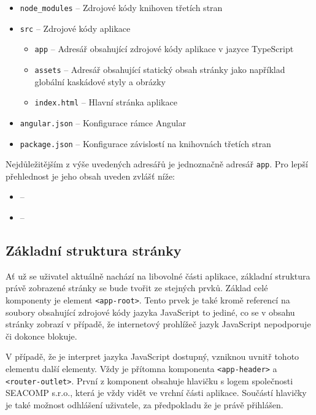 \begin{itemize}
  \item \texttt{node\_modules} -- Zdrojové kódy knihoven třetích stran
  \item \texttt{src} -- Zdrojové kódy aplikace
  \begin{itemize}
    \item \texttt{app} -- Adresář obsahující zdrojové kódy aplikace v jazyce TypeScript
     \item \texttt{assets} -- Adresář obsahující statický obsah stránky jako například globální kaskádové styly a obrázky
     \item \texttt{index.html} -- Hlavní stránka aplikace
  \end{itemize}
  \item \texttt{angular.json} -- Konfigurace rámce Angular
  \item \texttt{package.json} -- Konfigurace závislostí na knihovnách třetích stran
\end{itemize}

Nejdůležitějším z výše uvedených adresářů je jednoznačně adresář \texttt{app}. Pro lepší přehlednost je jeho obsah uveden zvlášť níže:

\begin{itemize}
  \item \texttt{} -- 
  \item \texttt{} --
\end{itemize}


\subsection{Základní struktura stránky}
Ať už se uživatel aktuálně nachází na libovolné části aplikace, základní struktura právě zobrazené stránky se bude tvořit ze stejných prvků. Základ celé komponenty je element \texttt{<app-root>}. Tento prvek je také kromě referencí na soubory obsahující zdrojové kódy jazyka JavaScript to jediné, co se v obsahu stránky zobrazí v případě, že internetový prohlížeč jazyk JavaScript nepodporuje či dokonce blokuje. 

V případě, že je interpret jazyka JavaScript dostupný, vzniknou uvnitř tohoto elementu další elementy. Vždy je přítomna komponenta \texttt{<app-header>} a \texttt{<router-outlet>}. První z komponent obsahuje hlavičku s logem společnosti SEACOMP s.r.o., která je vždy vidět ve vrchní části aplikace. Součástí hlavičky je také možnost odhlášení uživatele, za předpokladu že je právě přihlášen.

